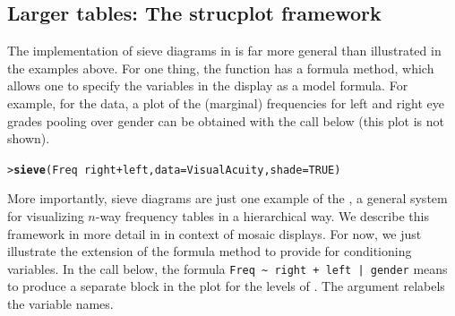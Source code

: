 \documentclass[10pt,krantz2]{krantz}\usepackage[]{graphicx}\usepackage[]{color}
\makeatletter
\newcommand{\hlnum}[1]{\textcolor[rgb]{0.686,0.059,0.569}{#1}}%
\newcommand{\hlopt}[1]{\textcolor[rgb]{0,0,0}{#1}}%
\newcommand{\hlstd}[1]{\textcolor[rgb]{0.345,0.345,0.345}{#1}}%
\newcommand{\hlkwc}[1]{\textcolor[rgb]{0.333,0.667,0.333}{#1}}%
\newcommand{\hlkwd}[1]{\textcolor[rgb]{0.737,0.353,0.396}{\textbf{#1}}}%
\newenvironment{kframe}{%
 \def\at@end@of@kframe{}%
 \ifinner\ifhmode%
  \def\at@end@of@kframe{\end{minipage}}%
  \begin{minipage}{\columnwidth}%
 \fi\fi%
 \def\FrameCommand##1{\hskip\@totalleftmargin \hskip-\fboxsep
 \colorbox{shadecolor}{##1}\hskip-\fboxsep
     \hskip-\linewidth \hskip-\@totalleftmargin \hskip\columnwidth}%
 \MakeFramed {\advance\hsize-\width
   \@totalleftmargin\z@ \linewidth\hsize
   \@setminipage}}%
 {\par\unskip\endMakeFramed%
 \at@end@of@kframe}
\newenvironment{knitrout}{}{} %
\renewenvironment{knitrout}{\small\renewcommand{\baselinestretch}{.85}}{} %
\makeatother
\begin{document}
\subsection{Larger tables: The strucplot framework}\label{sec:twoway-sieve-larger}
The implementation of sieve diagrams in  is far more
general than illustrated in the examples above.  For one thing,
the  function has a formula method, which allows one to specify
the variables in the display as a model formula.
For example, for the  data, a plot of
the (marginal) frequencies for left and right eye grades
pooling over gender can be obtained with the call below
(this plot is not shown).

\begin{knitrout}
\color{fgcolor}\begin{kframe}
\begin{alltt}
\hlstd{> }\hlkwd{sieve}\hlstd{(Freq} \hlopt{~} \hlstd{right} \hlopt{+} \hlstd{left,} \hlkwc{data} \hlstd{= VisualAcuity,} \hlkwc{shade} \hlstd{=} \hlnum{TRUE}\hlstd{)}
\end{alltt}
\end{kframe}
\end{knitrout}

More importantly, sieve diagrams are just one example of
the , a general system for
visualizing $n$-way frequency tables in a hierarchical
way.  We describe this framework in more detail in
 in context of mosaic
displays.  For now, we just illustrate the extension of
the formula method to provide for conditioning variables.
In the call below, the formula \verb#Freq ~ right + left | gender#
means to produce a separate block in the plot for the levels of
. The  argument relabels the
variable names.
\end{document}
